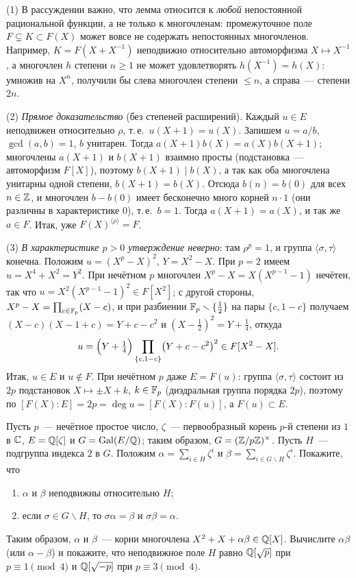 \begin{remark}
(1) В рассуждении важно, что лемма  относится к \emph{любой} непостоянной рациональной функции, а не только к
многочленам: промежуточное поле $F\subsetneq K\subset F(X)$ может вовсе не содержать непостоянных многочленов. Например,
$K=F(X+X^{-1})$ неподвижно относительно автоморфизма $X\mapsto X^{-1}$, а многочлен $h$ степени $n\ge1$ не может удовлетворять
$h(X^{-1})=h(X)$: умножив на $X^n$, получили бы слева многочлен степени $\le n$, а справа~--- степени $2n$.

(2) \emph{Прямое доказательство} (без степеней расширений). Каждый $u\in E$ неподвижен относительно $\rho$, т.\,е.\
$u(X+1)=u(X)$. Запишем $u=a/b$, $\gcd(a,b)=1$, $b$ унитарен. Тогда $a(X+1)b(X)=a(X)b(X+1)$; многочлены $a(X+1)$ и
$b(X+1)$ взаимно просты (подстановка~--- автоморфизм $F[X]$), поэтому $b(X+1)\mid b(X)$, а так как оба многочлена
унитарны одной степени, $b(X+1)=b(X)$. Отсюда $b(n)=b(0)$ для всех $n\in\mathbb Z$, и многочлен $b-b(0)$ имеет бесконечно много
корней $n\cdot1$ (они различны в характеристике $0$), т.\,е.\ $b=1$. Тогда $a(X+1)=a(X)$, и так же $a\in F$. Итак, уже
$F(X)^{\langle\rho\rangle}=F$.

(3) \emph{В характеристике $p>0$ утверждение неверно}: там $\rho^p=1$, и группа $\langle\sigma,\tau\rangle$ конечна. Положим
$u=(X^p-X)^2$, $Y=X^2-X$. При $p=2$ имеем $u=X^4+X^2=Y^2$. При нечётном $p$ многочлен $X^p-X=X(X^{p-1}-1)$ нечётен, так
что $u=X^2(X^{p-1}-1)^2\in F[X^2]$; с другой стороны, $X^p-X=\prod_{c\in\mathbb F_p}(X-c)$, и при разбиении $\mathbb F_p\smallsetminus\{\frac12\}$
на пары $\{c,1-c\}$ получаем $(X-c)(X-1+c)=Y+c-c^2$ и $(X-\frac12)^2=Y+\frac14$, откуда
\[
u=\Bigl(Y+\tfrac14\Bigr)\prod_{\{c,1-c\}}\bigl(Y+c-c^2\bigr)^2\in F[X^2-X].
\]
Итак, $u\in E$ и $u\notin F$. При нечётном $p$ даже $E=F(u)$: группа $\langle\sigma,\tau\rangle$ состоит из $2p$ подстановок
$X\mapsto\pm X+k$, $k\in\mathbb F_p$ (диэдральная группа порядка $2p$), поэтому по \rf{3.11} $[F(X):E]=2p=\deg u=[F(X):F(u)]$, а
$F(u)\subset E$.
\end{remark}

\begin{exercise}[3-2]
Пусть $p$~--- нечётное простое число, $\zeta$~--- первообразный корень $p$-й степени из $1$ в $\mathbb C$, $E=\mathbb Q[\zeta]$ и
$G=\operatorname{Gal}(E/\mathbb Q)$; таким образом, $G=(\mathbb Z/p\mathbb Z)^\times$. Пусть $H$~--- подгруппа индекса $2$ в $G$. Положим
$\alpha=\sum_{i\in H}\zeta^i$ и $\beta=\sum_{i\in G\smallsetminus H}\zeta^i$. Покажите, что
\begin{enumerate}[label=(\alph*)]
\item $\alpha$ и $\beta$ неподвижны относительно $H$;
\item если $\sigma\in G\smallsetminus H$, то $\sigma\alpha=\beta$ и $\sigma\beta=\alpha$.
\end{enumerate}
Таким образом, $\alpha$ и $\beta$~--- корни многочлена $X^2+X+\alpha\beta\in\mathbb Q[X]$. Вычислите $\alpha\beta$ (или
$\alpha-\beta$) и покажите, что неподвижное поле $H$ равно $\mathbb Q[\sqrt p]$ при $p\equiv1\pmod4$ и $\mathbb Q[\sqrt{-p}]$ при
$p\equiv3\pmod4$.
\end{exercise}

